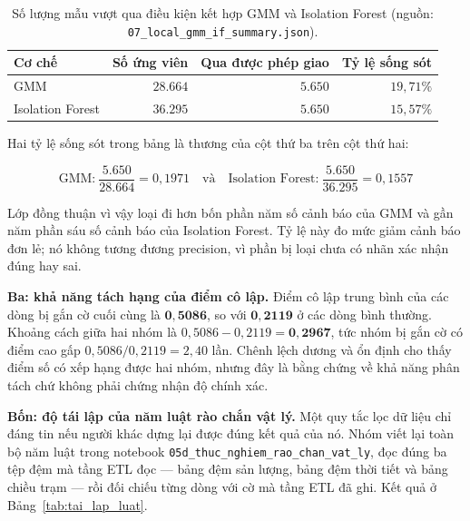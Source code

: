 \begin{table}[htbp]
\centering
\caption{Số lượng mẫu vượt qua điều kiện kết hợp GMM và Isolation Forest (nguồn: \texttt{07\_local\_gmm\_if\_summary.json}).}
\label{tab:song_sot_and}
\small
\begin{tabular}{l r r r}
\toprule
\textbf{Cơ chế} & \textbf{Số ứng viên} & \textbf{Qua được phép giao} & \textbf{Tỷ lệ sống sót} \\
\midrule
GMM              & $28.664$ & $5.650$ & $19{,}71\%$ \\
Isolation Forest & $36.295$ & $5.650$ & $15{,}57\%$ \\
\bottomrule
\end{tabular}
\end{table}

Hai tỷ lệ sống sót trong bảng là thương của cột thứ ba trên cột thứ hai:

\begin{equation}
\text{GMM:}\ \frac{5.650}{28.664} = 0{,}1971 \quad\text{và}\quad
\text{Isolation Forest:}\ \frac{5.650}{36.295} = 0{,}1557
\end{equation}

Lớp đồng thuận vì vậy loại đi hơn bốn phần năm số cảnh báo của GMM và gần năm phần sáu số
cảnh báo của Isolation Forest. Tỷ lệ này đo mức giảm cảnh báo đơn lẻ; nó không tương
đương precision, vì phần bị loại chưa có nhãn xác nhận đúng hay sai.

\textbf{Ba: khả năng tách hạng của điểm cô lập.} Điểm cô lập trung bình của các dòng bị
gắn cờ cuối cùng là $\mathbf{0{,}5086}$, so với $\mathbf{0{,}2119}$ ở các dòng bình thường.
Khoảng cách giữa hai nhóm là $0{,}5086 - 0{,}2119 = \mathbf{0{,}2967}$, tức nhóm bị gắn cờ có
điểm cao gấp $0{,}5086 / 0{,}2119 = 2{,}40$ lần. Chênh lệch dương và ổn định cho thấy điểm số
có xếp hạng được hai nhóm, nhưng đây là bằng chứng về khả năng phân tách chứ không phải chứng
nhận độ chính xác.

\textbf{Bốn: độ tái lập của năm luật rào chắn vật lý.} Một quy tắc lọc dữ liệu chỉ đáng
tin nếu người khác dựng lại được đúng kết quả của nó. Nhóm viết lại toàn bộ năm luật trong
notebook \texttt{05d\_thuc\_nghiem\_rao\_chan\_vat\_ly}, đọc đúng ba tệp đệm mà tầng ETL đọc --- bảng
đệm sản lượng, bảng đệm thời tiết và bảng chiều trạm --- rồi đối chiếu từng dòng với cờ mà
tầng ETL đã ghi. Kết quả ở Bảng~\ref{tab:tai_lap_luat}.

